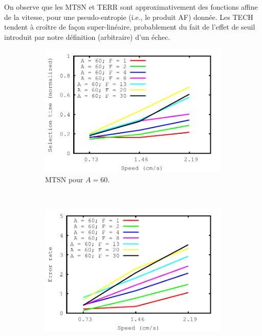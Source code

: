 	On observe que les MTSN et TERR sont approximativement des fonctions affine de la vitesse, pour une pseudo-entropie (i.e., le produit AF) donnée. Les TECH tendent à croître de façon super-linéaire, probablement du fait de l'effet de seuil introduit par notre définition (arbitraire) d'un échec.

	\newcommand{\subImgWlineplot}{0.48\textwidth}
	\begin{figure}[!htb]
		\centering
		\begin{subfigure}[t]{\subImgWlineplot}
			\centering
			\includegraphics[width=\textwidth]{figures/ch4/speed_angle_60_times}
			\caption{MTSN pour $A = 60$.}
			\label{fig:spEffect_t_60}
		\end{subfigure}
		~
		\begin{subfigure}[t]{\subImgWlineplot}
			\centering
			\includegraphics[width=\textwidth]{figures/ch4/speed_angle_60_errors}

\end{subfigure}
\end{figure}
